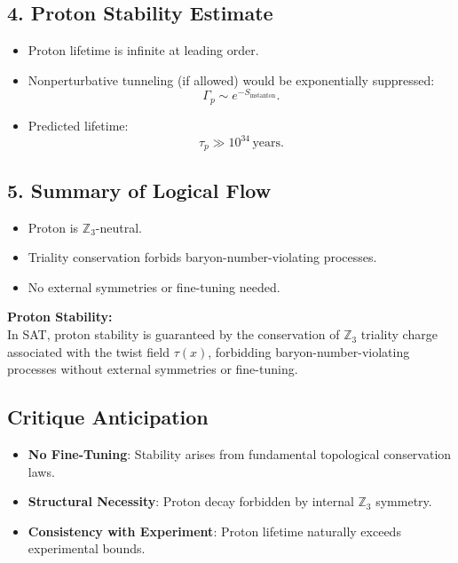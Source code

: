 \documentclass[12pt]{article}
\begin{document}
\subsection*{4. Proton Stability Estimate}
\begin{itemize}
    \item Proton lifetime is infinite at leading order.
    \item Nonperturbative tunneling (if allowed) would be exponentially suppressed:
    \[
    \Gamma_p \sim e^{-S_\text{instanton}}.
    \]
    \item Predicted lifetime:
    \[
    \tau_p \gg 10^{34} \, \text{years}.
    \]
\end{itemize}

\subsection*{5. Summary of Logical Flow}
\begin{itemize}
    \item Proton is \(\mathbb{Z}_3\)-neutral.
    \item Triality conservation forbids baryon-number-violating processes.
    \item No external symmetries or fine-tuning needed.
\end{itemize}

\begin{mdframed}[linewidth=1pt, roundcorner=5pt, backgroundcolor=white]
\textbf{Proton Stability:} \\
In SAT, proton stability is guaranteed by the conservation of \(\mathbb{Z}_3\) triality charge associated with the twist field \( \tau(x) \), forbidding baryon-number-violating processes without external symmetries or fine-tuning.
\end{mdframed}

\subsection*{Critique Anticipation}
\begin{itemize}
    \item \textbf{No Fine-Tuning}: Stability arises from fundamental topological conservation laws.
    \item \textbf{Structural Necessity}: Proton decay forbidden by internal \(\mathbb{Z}_3\) symmetry.
    \item \textbf{Consistency with Experiment}: Proton lifetime naturally exceeds experimental bounds.
\end{itemize}
\end{document}
